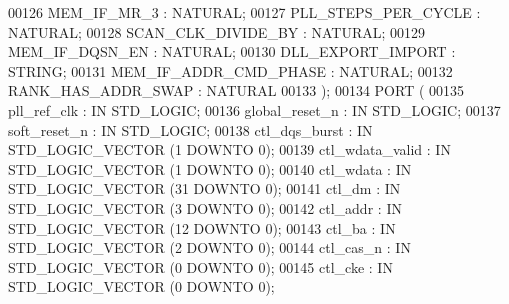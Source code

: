 \begin{DoxyCode}
{00126         MEM\_IF\_MR\_3 : \textcolor{comment}{NATURAL};
00127         PLL\_STEPS\_PER\_CYCLE : \textcolor{comment}{NATURAL};
00128         SCAN\_CLK\_DIVIDE\_BY  : \textcolor{comment}{NATURAL};
00129         MEM\_IF\_DQSN\_EN  : \textcolor{comment}{NATURAL};
00130         DLL\_EXPORT\_IMPORT   : \textcolor{comment}{STRING};
00131         MEM\_IF\_ADDR\_CMD\_PHASE   : \textcolor{comment}{NATURAL};
00132         RANK\_HAS\_ADDR\_SWAP  : \textcolor{comment}{NATURAL}
00133     );
00134     \textcolor{keywordflow}{PORT} (
00135         pll\_ref\_clk : \textcolor{keywordflow}{IN} \textcolor{comment}{STD\_LOGIC};
00136         global\_reset\_n  : \textcolor{keywordflow}{IN} \textcolor{comment}{STD\_LOGIC};
00137         soft\_reset\_n    : \textcolor{keywordflow}{IN} \textcolor{comment}{STD\_LOGIC};
00138         ctl\_dqs\_burst   : \textcolor{keywordflow}{IN} \textcolor{comment}{STD\_LOGIC\_VECTOR} (\textcolor{vhdllogic}{}\textcolor{vhdllogic}{1} \textcolor{keywordflow}{DOWNTO} \textcolor{vhdllogic}{}\textcolor{vhdllogic}{0});
00139         ctl\_wdata\_valid : \textcolor{keywordflow}{IN} \textcolor{comment}{STD\_LOGIC\_VECTOR} (\textcolor{vhdllogic}{}\textcolor{vhdllogic}{1} \textcolor{keywordflow}{DOWNTO} \textcolor{vhdllogic}{}\textcolor{vhdllogic}{0});
00140         ctl\_wdata   : \textcolor{keywordflow}{IN} \textcolor{comment}{STD\_LOGIC\_VECTOR} (\textcolor{vhdllogic}{}\textcolor{vhdllogic}{31} \textcolor{keywordflow}{DOWNTO} \textcolor{vhdllogic}{}\textcolor{vhdllogic}{0});
00141         ctl\_dm  : \textcolor{keywordflow}{IN} \textcolor{comment}{STD\_LOGIC\_VECTOR} (\textcolor{vhdllogic}{}\textcolor{vhdllogic}{3} \textcolor{keywordflow}{DOWNTO} \textcolor{vhdllogic}{}\textcolor{vhdllogic}{0});
00142         ctl\_addr    : \textcolor{keywordflow}{IN} \textcolor{comment}{STD\_LOGIC\_VECTOR} (\textcolor{vhdllogic}{}\textcolor{vhdllogic}{12} \textcolor{keywordflow}{DOWNTO} \textcolor{vhdllogic}{}\textcolor{vhdllogic}{0});
00143         ctl\_ba  : \textcolor{keywordflow}{IN} \textcolor{comment}{STD\_LOGIC\_VECTOR} (\textcolor{vhdllogic}{}\textcolor{vhdllogic}{2} \textcolor{keywordflow}{DOWNTO} \textcolor{vhdllogic}{}\textcolor{vhdllogic}{0});
00144         ctl\_cas\_n   : \textcolor{keywordflow}{IN} \textcolor{comment}{STD\_LOGIC\_VECTOR} (\textcolor{vhdllogic}{}\textcolor{vhdllogic}{0} \textcolor{keywordflow}{DOWNTO} \textcolor{vhdllogic}{}\textcolor{vhdllogic}{0});
00145         ctl\_cke : \textcolor{keywordflow}{IN} \textcolor{comment}{STD\_LOGIC\_VECTOR} (\textcolor{vhdllogic}{}\textcolor{vhdllogic}{0} \textcolor{keywordflow}{DOWNTO} \textcolor{vhdllogic}{}\textcolor{vhdllogic}{0});
}
\end{DoxyCode}
